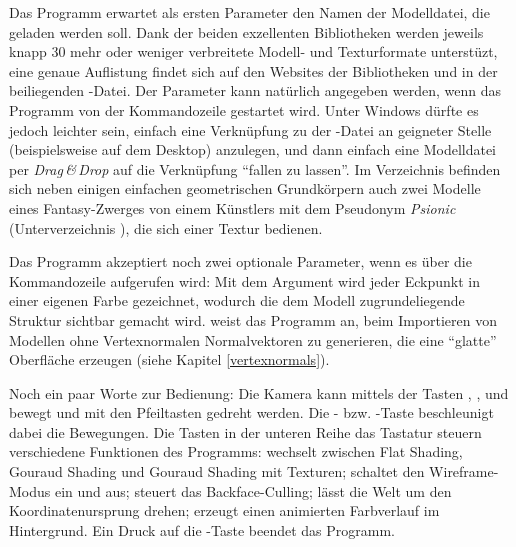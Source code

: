 Das Programm erwartet als ersten Parameter den Namen der Modelldatei, die geladen werden soll. Dank der beiden exzellenten Bibliotheken werden jeweils knapp 30 mehr oder weniger verbreitete Modell- und Texturformate unterstüzt, eine genaue Auflistung findet sich auf den Websites der Bibliotheken und in der beiliegenden -Datei. Der Parameter kann natürlich angegeben werden, wenn das Programm von der Kommandozeile gestartet wird. Unter Windows dürfte es jedoch leichter sein, einfach eine Verknüpfung zu der -Datei an geigneter Stelle (beispielsweise auf dem Desktop) anzulegen, und dann einfach eine Modelldatei per \emph{Drag\,\&\,Drop} auf die Verknüpfung \enquote{fallen zu lassen}. Im Verzeichnis  befinden sich neben einigen einfachen geometrischen Grundkörpern auch zwei Modelle eines Fantasy-Zwerges von einem Künstlers mit dem Pseudonym \emph{Psionic} (Unterverzeichnis ), die sich einer Textur bedienen.

Das Programm akzeptiert noch zwei optionale Parameter, wenn es über die Kommandozeile aufgerufen wird: Mit dem Argument  wird jeder Eckpunkt in einer eigenen Farbe gezeichnet, wodurch die dem Modell zugrundeliegende Struktur sichtbar gemacht wird.  weist das Programm an, beim Importieren von Modellen ohne Vertexnormalen Normalvektoren zu generieren, die eine \enquote{glatte} Oberfläche erzeugen (siehe Kapitel \ref{vertexnormals}).

Noch ein paar Worte zur Bedienung: Die Kamera kann mittels der Tasten , ,  und  bewegt und mit den Pfeiltasten gedreht werden. Die - bzw. -Taste beschleunigt dabei die Bewegungen. Die Tasten in der unteren Reihe das Tastatur steuern verschiedene Funktionen des Programms:  wechselt zwischen Flat Shading, Gouraud Shading und Gouraud Shading mit Texturen;  schaltet den Wireframe-Modus ein und aus;  steuert das Backface-Culling;  lässt die Welt um den Koordinatenursprung drehen;  erzeugt einen animierten Farbverlauf im Hintergrund. Ein Druck auf die -Taste beendet das Programm.